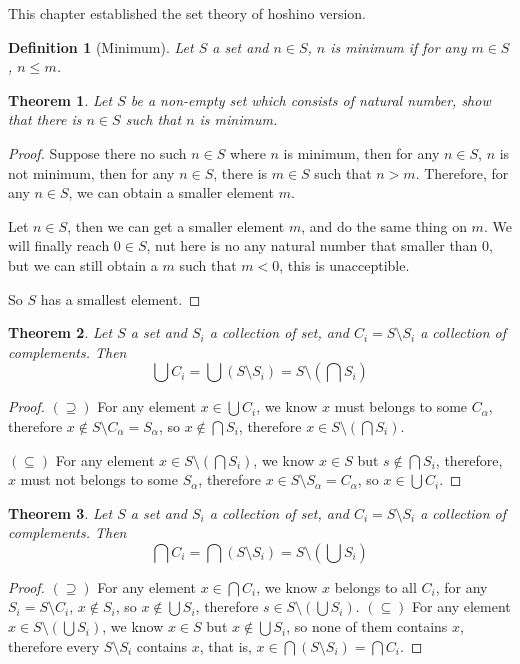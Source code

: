 \documentclass[14pt]{extarticle}
\newtheorem{theorem}{Theorem}[section]
\newtheorem{definition}{Definition}[section]
\newcommand{\1}{\{e\}}
\begin{document}
This chapter established the set theory of hoshino version.

\begin{definition}[Minimum]
  Let $S$ a set and $n \in S$, $n$ is minimum if
  for any $m \in S$, $n \leq m$.
\end{definition}

\begin{theorem}
  Let $S$ be a non-empty set which consists of natural number,
  show that there is $n \in S$ such that $n$ is minimum.
\end{theorem}
\begin{proof}
  Suppose there no such $n \in S$ where $n$ is minimum, then
  for any $n \in S$, $n$ is not minimum,
  then for any $n \in S$, there is $m \in S$ such that $n > m$.
  Therefore, for any $n \in S$, we can obtain a smaller element $m$.

  Let $n \in S$, then we can get a smaller element $m$,
  and do the same thing on $m$. We will finally reach $0 \in S$,
  nut here is no any natural number that smaller than $0$,
  but we can still obtain a $m$ such that $m < 0$,
  this is unacceptible.

  So $S$ has a smallest element.
\end{proof}

\begin{theorem}
  Let $S$ a set and $S_i$ a collection of set, and $C_i = S \setminus S_i$ a collection of
  complements. Then
  \[
  \bigcup C_i = \bigcup (S \setminus S_i) = S \setminus (\bigcap S_i)
  \]
\end{theorem}
\begin{proof}
  $(\supseteq)$ For any element $x \in \bigcup C_i$, we know $x$ must belongs to some $C_\alpha$,
  therefore $x \notin S \setminus C_\alpha = S_\alpha$, so $x \notin \bigcap S_i$,
  therefore $x \in S \setminus (\bigcap S_i)$.

  $(\subseteq)$ For any element $x \in S \setminus (\bigcap S_i)$, we know $x \in S$
  but $s \notin \bigcap S_i$, therefore, $x$ must not belongs to some $S_\alpha$,
  therefore $x \in S \setminus S_\alpha = C_\alpha$, so $x \in \bigcup C_i$.
\end{proof}

\begin{theorem}
  Let $S$ a set and $S_i$ a collection of set, and $C_i = S \setminus S_i$ a collection of complements.
  Then
  \[
  \bigcap C_i = \bigcap (S \setminus S_i) = S \setminus (\bigcup S_i)
  \]
\end{theorem}
\begin{proof}
  $(\supseteq)$ For any element $x \in \bigcap C_i$, we know $x$ belongs to all $C_i$,
  for any $S_i = S \setminus C_i$, $x \notin S_i$, so $x \notin \bigcup S_i$,
  therefore $s \in S \setminus (\bigcup S_i)$.
  $(\subseteq)$ For any element $x \in S \setminus (\bigcup S_i)$, we know $x \in S$
  but $x \notin \bigcup S_i$, so none of them contains $x$, therefore every $S \setminus S_i$ contains $x$,
  that is, $x \in \bigcap (S \setminus S_i) = \bigcap C_i$. 
\end{proof}
\end{document}
